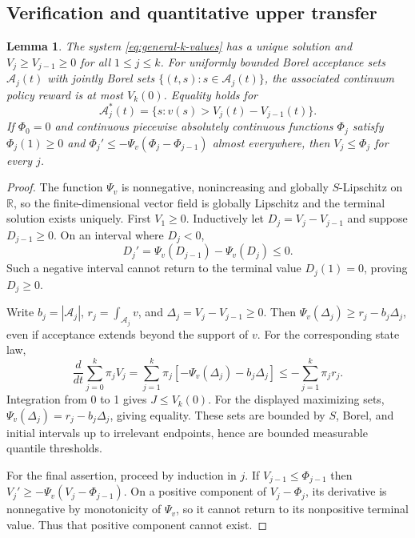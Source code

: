 \documentclass[11pt]{article}
\newtheorem{lemma}[theorem]{Lemma}
\theoremstyle{remark}
\begin{document}
\subsection{Verification and quantitative upper transfer}

\begin{lemma}\label{lem:general-k-verification}
The system \eqref{eq:general-k-values} has a unique solution and
$V_j\ge V_{j-1}\ge0$ for all $1\le j\le k$. For uniformly bounded
Borel acceptance sets $\mathcal A_j(t)$ with jointly Borel sets
$\{(t,s):s\in\mathcal A_j(t)\}$, the associated continuum
policy reward is at most $V_k(0)$. Equality holds for
\[
 \mathcal A_j^*(t)=\{s:v(s)>V_j(t)-V_{j-1}(t)\}.
\]
If $\Phi_0=0$ and continuous piecewise absolutely continuous functions
$\Phi_j$ satisfy $\Phi_j(1)\ge0$ and
$\Phi_j'\le-\Psi_v(\Phi_j-\Phi_{j-1})$ almost everywhere, then
$V_j\le\Phi_j$ for every $j$.
\end{lemma}

\begin{proof}
The function $\Psi_v$ is nonnegative, nonincreasing and globally
$S$-Lipschitz on $\mathbb R$, so the finite-dimensional vector field
is globally Lipschitz and the terminal solution exists uniquely.
First $V_1\ge0$. Inductively let $D_j=V_j-V_{j-1}$ and suppose
$D_{j-1}\ge0$. On an interval where $D_j<0$,
\[
 D_j'=\Psi_v(D_{j-1})-\Psi_v(D_j)\le0.
\]
Such a negative interval cannot return to the terminal value
$D_j(1)=0$, proving $D_j\ge0$.

Write $b_j=|\mathcal A_j|$,
$r_j=\int_{\mathcal A_j}v$, and $\Delta_j=V_j-V_{j-1}\ge0$.
Then $\Psi_v(\Delta_j)\ge r_j-b_j\Delta_j$, even if acceptance
extends beyond the support of $v$. For the corresponding state law,
\[
 \frac{d}{dt}\sum_{j=0}^k\pi_jV_j
 =\sum_{j=1}^k\pi_j[-\Psi_v(\Delta_j)-b_j\Delta_j]
 \le-\sum_{j=1}^k\pi_jr_j.
\]
Integration from 0 to 1 gives $J\le V_k(0)$. For the displayed
maximizing sets, $\Psi_v(\Delta_j)=r_j-b_j\Delta_j$, giving equality.
These sets are bounded by $S$, Borel, and initial intervals up to
irrelevant endpoints, hence are bounded measurable quantile thresholds.

For the final assertion, proceed by induction in $j$. If
$V_{j-1}\le\Phi_{j-1}$ then
$V_j'\ge-\Psi_v(V_j-\Phi_{j-1})$. On a positive component of
$V_j-\Phi_j$, its derivative is nonnegative by monotonicity of
$\Psi_v$, so it cannot return to its nonpositive terminal value.
Thus that positive component cannot exist.
\end{proof}
\end{document}
